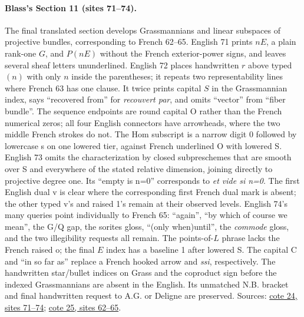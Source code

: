 \documentclass[10pt,a4paper]{article}
\begin{document}
\paragraph{Blass's Section 11 (sites 71--74).}
The final translated section develops Grassmannians and linear subspaces of projective bundles, corresponding to French 62--65. English 71 prints $nE$, a plain rank-one $G$, and $P(nE)$ without the French exterior-power signs, and leaves several sheaf letters ununderlined. English 72 places handwritten $r$ above typed $(n)$ with only $n$ inside the parentheses; it repeats two representability lines where French 63 has one clause. It twice prints capital $S$ in the Grassmannian index, says ``recovered from'' for \emph{recouvert par}, and omits ``vector'' from ``fiber bundle''. The sequence endpoints are round capital O rather than the French numerical zeros; all four English connectors have arrowheads, where the two middle French strokes do not. The Hom subscript is a narrow digit 0 followed by lowercase s on one lowered tier, against French underlined O with lowered S. English 73 omits the characterization by closed subpreschemes that are smooth over S and everywhere of the stated relative dimension, joining directly to projective degree one. Its ``empty is n=0'' corresponds to \emph{et vide si n=0}. The first English dual v is clear where the corresponding first French dual mark is absent; the other typed v's and raised 1's remain at their observed levels. English 74's many queries point individually to French 65: ``again'', ``by which of course we mean'', the G/Q gap, the sorites gloss, ``(only when)until'', the \emph{commode} gloss, and the two illegibility requests all remain. The points-of-$L$ phrase lacks the French raised o; the final $E$ index has a baseline 1 after lowered S. The capital C and ``in so far as'' replace a French hooked arrow and \emph{ssi}, respectively. The handwritten star/bullet indices on Grass and the coproduct sign before the indexed Grassmannians are absent in the English. Its unmatched N.B. bracket and final handwritten request to A.G. or Deligne are preserved. Sources: \href{https://grothendieck.umontpellier.fr/web/viewer.html?file=../24.pdf\#page=72}{cote 24, sites 71--74}; \href{https://grothendieck.umontpellier.fr/web/viewer.html?file=../25.pdf\#page=63}{cote 25, sites 62--65}.
\end{document}
